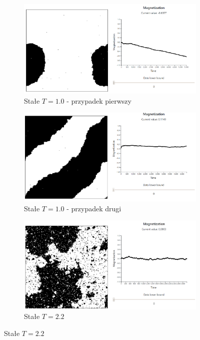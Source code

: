 \documentclass[11pt] {article}
\begin{document}
\begin{figure}[H]
\centering
\begin{subfigure}{.48\textwidth}
  \centering
  \includegraphics[width=0.9\linewidth]{res/T_1.png}
  \caption{Stałe $T = 1.0$ - przypadek pierwszy}
  \label{fig:T1}
\end{subfigure}
\begin{subfigure}{.48\textwidth}
  \centering
  \includegraphics[width=0.9\linewidth]{res/T_1_2.png}
  \caption{Stałe $T = 1.0$ - przypadek drugi}
  \label{fig:T12}
\end{subfigure}
\begin{subfigure}{.48\textwidth}
  \centering
  \includegraphics[width=0.9\linewidth]{res/T_2_2.png}
  \caption{Stałe $T = 2.2$}
  \label{fig:T2}

\end{subfigure}
\end{figure}
\end{document}
